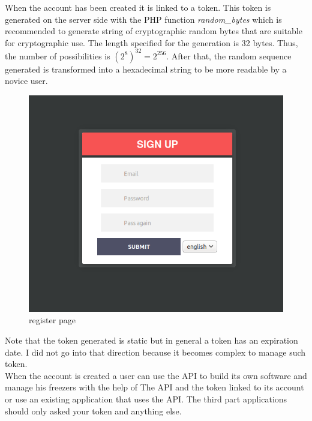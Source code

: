 When the account has been created it is linked to a token. This token is generated on the server side with the PHP function \textit{random\_bytes} which is recommended to generate string of cryptographic random bytes that are suitable for cryptographic use. The length  specified for the generation is 32 bytes. Thus, the number of possibilities is $(2^8)^{32} = 2^{256}$. After that, the random sequence generated is transformed into a hexadecimal string to be more readable by a novice user.\\
\begin{figure}[H]
\centering
\includegraphics[scale=0.4]{./images/register.png}
\caption{register page}
\label{fig:register}
\end{figure}

Note that the token generated is static but in general a token has an expiration date. I did not go into that direction because it becomes complex to manage such token. \\

When the account is created a user can use the API to build its own software and manage his freezers with the help of The API and the token linked to its account or use an existing application that uses the API. The third part applications should only asked your token and anything else.\\

